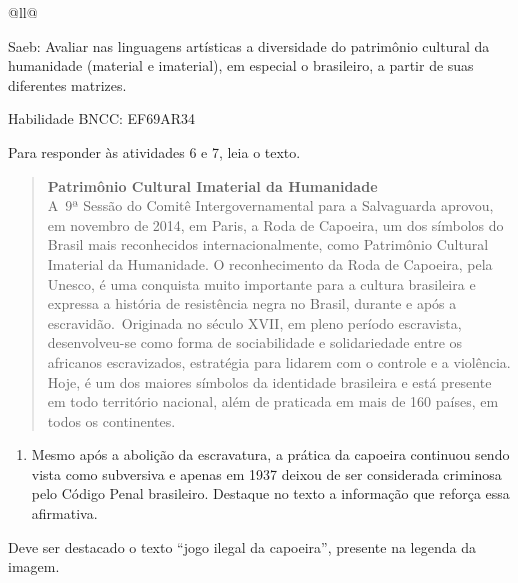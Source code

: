 \begin{itemize}
\begin{itemize}
\begin{escolha}[]{@{}ll@{}}
{Saeb: Avaliar nas linguagens artísticas a diversidade do patrimônio
cultural da humanidade (material e imaterial), em especial o brasileiro,
a partir de suas diferentes matrizes.

Habilidade BNCC: EF69AR34}

Para responder às atividades 6 e 7, leia o texto.


\begin{quote}
\textbf{Patrimônio Cultural Imaterial da Humanidade}\\
 A~9ª Sessão do
Comitê Intergovernamental para a Salvaguarda aprovou, em novembro de
2014, em Paris, a Roda de Capoeira, um dos símbolos do Brasil mais
reconhecidos internacionalmente, como Patrimônio Cultural Imaterial da
Humanidade. O reconhecimento da Roda de Capoeira, pela Unesco, é uma
conquista muito importante para a cultura brasileira e expressa a
história de resistência negra no Brasil, durante e após a
escravidão.~Originada no século XVII, em pleno período escravista,
desenvolveu-se como forma de sociabilidade e solidariedade entre os
africanos escravizados, estratégia para lidarem com o controle e a
violência. Hoje, é um dos maiores símbolos da identidade brasileira e
está presente em todo território nacional, além de praticada em mais de
160 países, em todos os continentes.

\end{quote}

\begin{enumerate}
\def\labelenumi{\arabic{enumi}.}
\setcounter{enumi}{2}
\item
  Mesmo após a abolição da escravatura, a prática da capoeira continuou
  sendo vista como subversiva e apenas em 1937 deixou de ser considerada
  criminosa pelo Código Penal brasileiro. Destaque no texto a informação
  que reforça essa afirmativa.
\end{enumerate}

Deve ser destacado o texto ``jogo ilegal da capoeira'', presente na
legenda da imagem.

\end{escolha}
\end{itemize}
\end{itemize}
